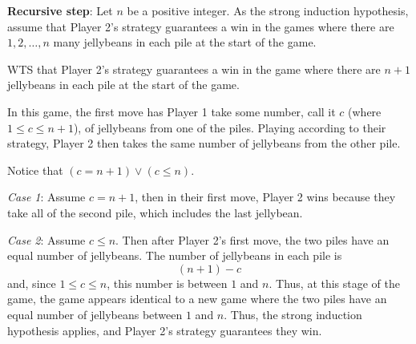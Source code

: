 \documentclass[12pt, oneside]{article}
\begin{document}
{\bf Recursive step}: Let $n$ be a positive integer. 
As the strong induction hypothesis, assume that
Player 2's strategy guarantees a win in the games 
where there are $1, 2, \ldots, n$ many jellybeans in each 
pile at the start of the game.

WTS that Player 2's strategy guarantees a win in the game where
there are $n+1$ jellybeans in each pile at the start of the game.

In this game, the first move has Player 1 take 
some number, call it $c$ (where $1 \leq c \leq n+1$),
of jellybeans from one of the piles. 
Playing according to their strategy, Player 2 then 
takes the same number of jellybeans from  the other pile.

Notice that $(c = n+1) \lor (c \leq n)$.

{\it Case 1}: Assume $c = n+1$, then in their first move, 
Player 2 wins because they take all of the second pile, which 
includes the last jellybean.

{\it Case 2}: Assume $c \leq n$. Then after Player 2's first move,
the two piles have an equal number of jellybeans. The number
of jellybeans in each pile is 
\[
    (n+1) - c
\]
and, since $1 \leq c \leq n$, this number is between $1$ and $n$.
Thus, at this stage of the game, the game appears identical to a new 
game where the two piles have an equal number of jellybeans between $1$
and $n$. Thus, the strong induction hypothesis applies, and Player 2's
strategy guarantees they win.

 \vfill
\end{document}
